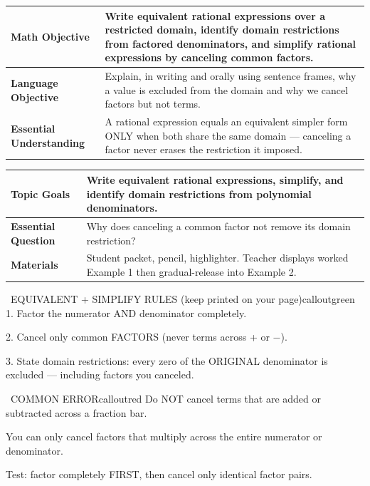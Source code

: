 \documentclass[11pt]{article}
\newcommand{\lessonrow}[2]{\textbf{#1} & #2 \\ \hline}
\begin{document}

{\small
\renewcommand{\arraystretch}{1.25}
\noindent\begin{tabular}{|p{1.8in}|p{4.8in}|}
\hline
\lessonrow{Math Objective}{Write equivalent rational expressions over a restricted domain, identify domain restrictions from factored denominators, and simplify rational expressions by canceling common factors.}
\lessonrow{Language Objective}{Explain, in writing and orally using sentence frames, why a value is excluded from the domain and why we cancel factors but not terms.}
\lessonrow{Essential Understanding}{A rational expression equals an equivalent simpler form ONLY when both share the same domain --- canceling a factor never erases the restriction it imposed.}
\end{tabular}
}

{\small
\renewcommand{\arraystretch}{1.25}
\noindent\begin{tabular}{|p{1.8in}|p{4.8in}|}
\hline
\lessonrow{Topic Goals}{Write equivalent rational expressions, simplify, and identify domain restrictions from polynomial denominators.}
\lessonrow{Essential Question}{Why does canceling a common factor not remove its domain restriction?}
\lessonrow{Materials}{Student packet, pencil, highlighter. Teacher displays worked Example 1 then gradual-release into Example 2.}
\end{tabular}
}


\begin{callout}{\IconBook\ EQUIVALENT + SIMPLIFY RULES (keep printed on your page)}{calloutgreen}
1. Factor the numerator AND denominator completely.

2. Cancel only common FACTORS (never terms across + or $-$).

3. State domain restrictions: every zero of the ORIGINAL denominator is excluded --- including factors you canceled.
\end{callout}

\begin{callout}{\IconWarn\ COMMON ERROR}{calloutred}
Do NOT cancel terms that are added or subtracted across a fraction bar.

You can only cancel factors that multiply across the entire numerator or denominator.

Test: factor completely FIRST, then cancel only identical factor pairs.
\end{callout}
\end{document}
